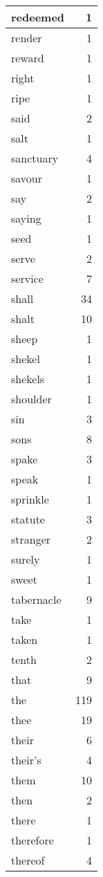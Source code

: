 \begin{center}
\begin{longtable}{l|r}
redeemed & 1 \\ \hline
render & 1 \\ \hline
reward & 1 \\ \hline
right & 1 \\ \hline
ripe & 1 \\ \hline
said & 2 \\ \hline
salt & 1 \\ \hline
sanctuary & 4 \\ \hline
savour & 1 \\ \hline
say & 2 \\ \hline
saying & 1 \\ \hline
seed & 1 \\ \hline
serve & 2 \\ \hline
service & 7 \\ \hline
shall & 34 \\ \hline
shalt & 10 \\ \hline
sheep & 1 \\ \hline
shekel & 1 \\ \hline
shekels & 1 \\ \hline
shoulder & 1 \\ \hline
sin & 3 \\ \hline
sons & 8 \\ \hline
spake & 3 \\ \hline
speak & 1 \\ \hline
sprinkle & 1 \\ \hline
statute & 3 \\ \hline
stranger & 2 \\ \hline
surely & 1 \\ \hline
sweet & 1 \\ \hline
tabernacle & 9 \\ \hline
take & 1 \\ \hline
taken & 1 \\ \hline
tenth & 2 \\ \hline
that & 9 \\ \hline
the & 119 \\ \hline
thee & 19 \\ \hline
their & 6 \\ \hline
their's & 4 \\ \hline
them & 10 \\ \hline
then & 2 \\ \hline
there & 1 \\ \hline
therefore & 1 \\ \hline
thereof & 4 \\ \hline

\end{longtable}
\end{center}
